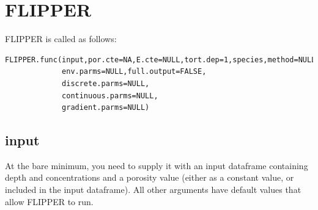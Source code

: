 \documentclass[10pt]{article}
\begin{document}
\section{FLIPPER}
\label{sect_functioning}
FLIPPER is called as follows:
\begin{verbatim}
FLIPPER.func(input,por.cte=NA,E.cte=NULL,tort.dep=1,species,method=NULL,
             env.parms=NULL,full.output=FALSE,
             discrete.parms=NULL,
             continuous.parms=NULL,
             gradient.parms=NULL)
\end{verbatim}

\subsection{input}
At the bare minimum, you need to supply it with an input dataframe containing depth and concentrations and a porosity value (either as a constant value, or included in the input dataframe). All other arguments have default values that allow FLIPPER to run.
\end{document}
